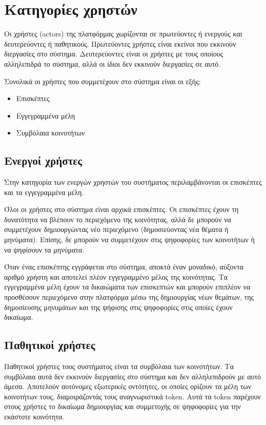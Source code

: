 \section{Κατηγορίες χρηστών} \label{section:3-4-user-categories}

Οι χρήστες (actors) της πλατφόρμας χωρίζονται σε πρωτεύοντες ή ενεργούς και δευτερεύοντες ή παθητικούς. Πρωτεύοντες χρήστες είναι εκείνοι που εκκινούν διεργασίες στο σύστημα. Δευτερεύοντες είναι οι χρήστες με τους οποίους αλληλεπιδρά το σύστημα, αλλά οι ίδιοι δεν εκκινούν διεργασίες σε αυτό.

Συνολικά οι χρήστες που συμμετέχουν στο σύστημα είναι οι εξής:

\begin{itemize}
    \item Επισκέπτες
    \item Εγγεγραμμένα μέλη
    \item Συμβόλαια κοινοτήτων
\end{itemize}

\subsection{Ενεργοί χρήστες}

Στην κατηγορία των ενεργών χρηστών του συστήματος περιλαμβάνονται οι επισκέπτες και τα εγγεγραμμένα μέλη.

Όλοι οι χρήστες στο σύστημα είναι αρχικά επισκέπτες. Οι επισκέπτες έχουν τη δυνατότητα να βλέπουν το περιεχόμενο της κοινότητας, αλλά δε μπορούν να συμμετέχουν δημιουργώντας νέο περιεχόμενο (δημοσιεύοντας νέα θέματα ή μηνύματα). Επίσης, δε μπορούν να συμμετέχουν στις ψηφοφορίες των κοινοτήτων ή να ψηφίσουν τα μηνύματα.

Όταν ένας επισκέπτης εγγράφεται στο σύστημα, αποκτά έναν μοναδικό, αύξοντα αριθμό χρήστη και αποτελεί πλέον εγγεγραμμένο μέλος της κοινότητας. Τα εγγεγραμμένα μέλη έχουν τα δικαιώματα των επισκεπτών και μπορούν επιπλέον να προσθέσουν περιεχόμενο στην πλατφόρμα μέσω της δημιουργίας νέων θεμάτων, της δημοσίευσης μηνυμάτων και της ψήφισης στις ψηφοφορίες στις οποίες έχουν δικαίωμα.

\subsection{Παθητικοί χρήστες}

Παθητικοί χρήστες τους συστήματος είναι τα συμβόλαια των κοινοτήτων. Τα συμβόλαια αυτά δεν εκκινούν διεργασίες στο σύστημα και δεν αλληλεπιδρούν με αυτό άμεσα. Αποτελούν αυτόνομες εξωτερικές οντότητες, οι οποίες ορίζουν τα μέλη των κοινοτήτων τους, διαμοιράζοντάς τους αναγνωριστικά token. Αυτά τα token παρέχουν στους χρήστες το δικαίωμα δημιουργίας και συμμετοχής σε ψηφοφορίες για την εκάστοτε κοινότητα.

